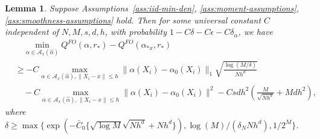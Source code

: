 \documentclass[11pt]{article}
\newtheorem{lemma}{Lemma}
\begin{document}
\begin{lemma}\label{lemma:MinMax:Claim1:covariate}
Suppose Assumptions~\ref{ass:iid-min-den}, \ref{ass:moment-assumptions}, \ref{ass:smoothness-assumptions} hold. Then for some universal constant $C$ independent of $N,M,s,d,h$, with probability $1-C\delta-C\epsilon-C\delta_{\alpha}$, we have 
$$\begin{array}{rl}
&\quad\displaystyle \min_{\alpha \in \mathcal{A}_x(\hat\alpha)} Q^{FO}(\alpha,r_*)-Q^{FO}(\alpha_{*x},r_*)\\
& \displaystyle 
 \geq-C\max_{\alpha \in \mathcal{A}_x(\hat\alpha), \|X_i-x\|\leq h}\|\alpha(X_i)-\alpha_0(X_i)\|_1 \sqrt{\frac{\log (M/\delta)}{Nh^d}}\\
&\quad \displaystyle {-} C\max_{\alpha \in \mathcal{A}_x(\hat\alpha), \|X_i-x\|\leq h}\!\!\|\alpha(X_i)\! - \!\alpha_0(X_i)\|^2 \!\!-Csdh^2\left(\frac{M}{\sqrt{Nh^{d}}}+Mdh^2\right),
\end{array}$$
where $\delta\geq\max\{\exp(-\bar{C}_0\{\sqrt{\log M}\sqrt{Nh^d}+Nh^d\}),\log(M)/(\delta_NNh^d),1/2^M\}$. 
\end{lemma}
\end{document}
